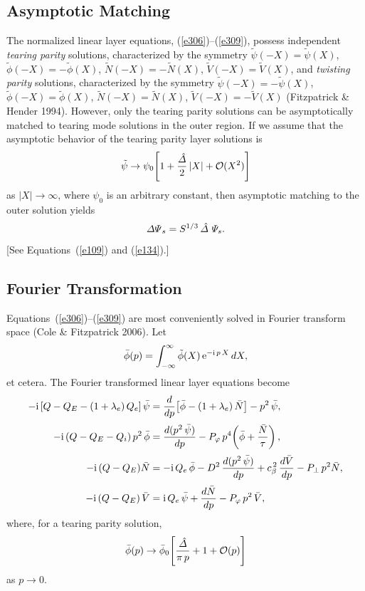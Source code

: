 \documentclass[notitlepage,12pt]{article}
\begin{document}
\subsection{Asymptotic Matching}
The normalized linear layer equations, (\ref{e306})--(\ref{e309}), possess independent {\em tearing parity}\/ solutions,
characterized by the symmetry $\tilde{\psi}(-X)=\tilde\psi(X)$, $\tilde{\phi}(-X)=-\tilde{\phi}(X)$, 
$\tilde{N}(-X)= - \tilde{N}(X)$, $\tilde{V}(-X)=\tilde{V}(X)$, and {\em twisting parity}\/ solutions, characterized by the symmetry 
$\tilde{\psi}(-X)=-\tilde\psi(X)$, $\tilde{\phi}(-X)=\tilde{\phi}(X)$, 
$\tilde{N}(-X)=  \tilde{N}(X)$, $\tilde{V}(-X)=-\tilde{V}(X)$ (Fitzpatrick \& Hender 1994). However, only the tearing parity
solutions can be asymptotically matched to tearing mode solutions in the outer region. If we assume that
the asymptotic behavior of the tearing parity layer solutions is
\begin{equation}\label{e311}
\tilde{\psi}\rightarrow  \psi_0\!\left[1+ \frac{\hat{\mit\Delta}}{2}\,|X| + {\cal O}(X^2)\right]
\end{equation}
as $|X|\rightarrow\infty$, where $\psi_0$ is an arbitrary constant, then asymptotic matching to the outer solution yields
\begin{equation}\label{e312}
{\mit\Delta\Psi}_s= S^{1/3}\,\hat{\mit\Delta}\,\,{\mit\Psi}_s.
\end{equation}
[See Equations~(\ref{e109}) and (\ref{e134}).] 

\subsection{Fourier Transformation}
Equations~(\ref{e306})--(\ref{e309}) are most conveniently solved in Fourier transform space (Cole \& Fitzpatrick 2006). 
Let
\begin{equation}
\bar{\phi}(p) = \int_{-\infty}^\infty \tilde{\phi}(X)\,{\rm e}^{-{\rm i}\,p\,X}\,dX,
\end{equation}
et cetera. The Fourier transformed linear layer equations become
\begin{align}\label{e314}
-{\rm i}\,[Q-Q_E-(1+\lambda_e)\,Q_{e}]\,\bar{\psi}&=\frac{d}{dp}\!\left[\bar{\phi}-(1+\lambda_e)\,\bar{N}\right] -p^2\,\bar{\psi},\\[0.5ex]
-{\rm i}\,(Q-Q_E -Q_{i})\,p^2\,\bar{\phi}&=  \frac{d(p^2\,\bar{\psi})}{dp}- P_\varphi\,p^4\!\left(\bar{\phi} + \frac{\bar{N}}{\tau}\right),\\[0.5ex]
-{\rm i}\,(Q-Q_E)\bar{N} &= - {\rm i}\,Q_{e}\,\bar{\phi} -D^{2}\,\frac{d(p^2\,\bar{\psi})}{dp}
 + c_\beta^{\,2}\,\frac{d\bar{V}}{dp} - P_\perp\,p^2\bar{N},\label{e316}\\[0.5ex]
 -{\rm i}\,(Q-Q_E)\,\bar{V} &= {\rm i}\,Q_{e}\,\bar{\psi} +\frac{d\bar{N}}{dp}- P_\varphi\,p^2\,\bar{V},\label{e317}
\end{align}
where, for a tearing parity solution, 
\begin{equation}
\bar{\phi}(p)\rightarrow \bar{\phi}_0\!\left[\frac{\hat{\mit\Delta}}{\pi\,p} + 1+ {\cal O}(p)\right]
\end{equation}
as $p\rightarrow 0$. 
\end{document}
